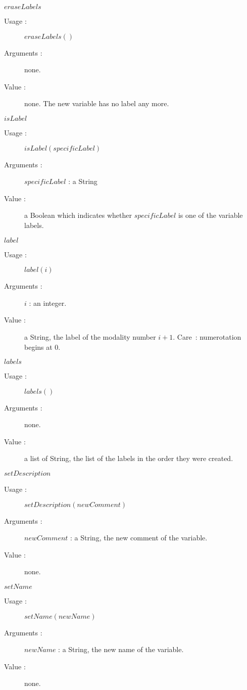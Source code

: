 \begin{description}
\begin{description}
  \item $eraseLabels$
    \begin{description}
    \item[Usage :]  $eraseLabels()$
    \item[Arguments :] none.
    \item[Value :]  none. The new variable has no label any more.
    \end{description}
    \bigskip

  \item $isLabel$
    \begin{description}
    \item[Usage :]  $isLabel(specificLabel)$
    \item[Arguments :] $specificLabel$ : a String
    \item[Value :]  a Boolean which indicates whether  $specificLabel$ is one of the variable labels.
    \end{description}
    \bigskip

  \item $label$
    \begin{description}
    \item[Usage :]  $label(i)$
    \item[Arguments :] $i$ : an integer.
    \item[Value :]  a String, the label of the modality number $i+1$. Care~: numerotation begins at 0.
    \end{description}
    \bigskip

  \item $labels$
    \begin{description}
    \item[Usage :]  $labels()$
    \item[Arguments :] none.
    \item[Value :]  a list of String, the list of the labels in the order they were created.
    \end{description}
    \bigskip

  \item $setDescription$
    \begin{description}
    \item[Usage :]  $setDescription(newComment)$
    \item[Arguments :] $newComment$ : a String, the new comment of the variable.
    \item[Value :]  none.
    \end{description}
    \bigskip

  \item $setName$
    \begin{description}
    \item[Usage :]  $setName(newName)$
    \item[Arguments :] $newName$ :  a String, the new name of the variable.
    \item[Value :]  none.
    \end{description}

  \end{description}


\end{description}



